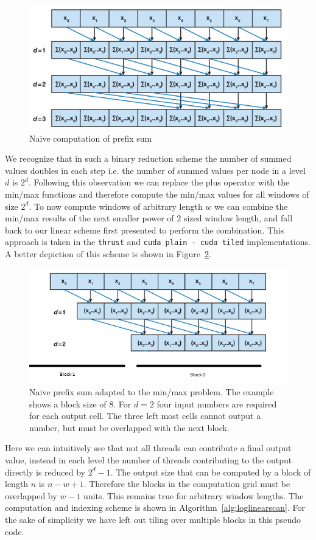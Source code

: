 \begin{figure}[h]
    \centering
    \includegraphics[width=0.8\linewidth]{Figures/prefix}
    \caption{Naive computation of prefix sum \cite{GG3}}
    \label{fig:prefixsum}
\end{figure}

We recognize that in such a binary reduction scheme the number of summed values doubles in each step i.e. the number of summed values per node in a level $d$ is $2^d$. Following this observation we can replace the plus operator with the min/max functions and therefore compute the min/max values for all windows of size $2^d$. To now compute windows of arbitrary length $w$ we can combine the min/max results of the next smaller power of 2 sized window length, and fall back to our linear scheme first presented to perform the combination. This approach is taken in the \texttt{thrust} and \texttt{cuda plain - cuda tiled} implementations. A better depiction of this scheme is shown in Figure~\ref{fig:prefixsum2}.

\begin{figure}[h]
    \centering
    \includegraphics[width=0.8\linewidth]{Figures/prefix2}
    \caption{Naive prefix sum adapted to the min/max problem. The example shows a block size of 8. For $d=2$ four input numbers are required for each output cell. The three left most cells cannot output a number, but must be overlapped with the next block.}
    \label{fig:prefixsum2}
\end{figure}

Here we can intuitively see that not all threads can contribute a final output value, instead in each level the number of threads contributing to the output directly is reduced by $2^d-1$. The output size that can be computed by a block of length $n$ is $n - w + 1$. Therefore the blocks in the computation grid must be overlapped by $w - 1$ units. This remains true for arbitrary window lengths. The computation and indexing scheme is shown in Algorithm~\ref{alg:loglinearscan}. For the sake of simplicity we have left out tiling over multiple blocks in this pseudo code.

